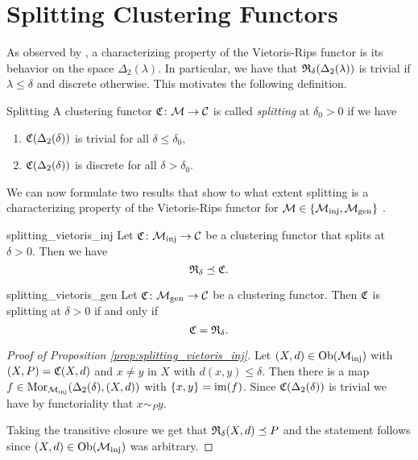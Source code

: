 \section{Splitting Clustering Functors}

As observed by \cite[Thm.~6.4]{Carlsson2010}, a characterizing property of the Vietoris-Rips functor is its behavior on the space $\Delta_2(\lambda)$. In particular, we have that $\mathfrak{R}_\delta(\Delta_2(\lambda))$ is trivial if $\lambda \le \delta$ and discrete otherwise.
This motivates the following definition.

\begin{definition}{Splitting}{}
    A clustering functor $\mathfrak{C}\colon \mathcal{M} \to \mathcal{C}$ is called \emph{splitting} at $\delta_0 > 0$ if we have
    \begin{enumerate}
        \item $\mathfrak{C}(\Delta_2(\delta))$ is trivial for all $\delta \leq \delta_0$,
        \item $\mathfrak{C}(\Delta_2(\delta))$ is discrete for all $\delta > \delta_0$.
    \end{enumerate}
\end{definition}

We can now formulate two results that show to what extent splitting is a characterizing property of the Vietoris-Rips functor for $\mathcal{M} \in \{{\mathcal{M}_\mathrm{inj}}, {\mathcal{M}_\mathrm{gen}}\}$ \cite[Thm.~6.4]{Carlsson2010}.

\begin{proposition}{}{splitting_vietoris_inj}
    Let $\mathfrak{C}\colon {\mathcal{M}_\mathrm{inj}} \to \mathcal{C}$ be a clustering functor that splits at $\delta > 0$. Then we have 
    $$
    \mathfrak{R}_\delta \preceq \mathfrak{C}.
    $$
\end{proposition}


\begin{proposition}{}{splitting_vietoris_gen}
    Let $\mathfrak{C}\colon {\mathcal{M}_\mathrm{gen}} \to \mathcal{C}$ be a clustering functor. Then $\mathfrak{C}$ is splitting at $\delta > 0$ if and only if 
    $$
    \mathfrak{C} = \mathfrak{R}_\delta.
    $$
\end{proposition}

\begin{proof}[Proof of Proposition \ref{prop:splitting_vietoris_inj}]
    Let $(X,d) \in \mathrm {Ob}({\mathcal{M}_\mathrm{inj}})$ with $(X,P) = \mathfrak{C}(X,d)$ and $x \neq y$ in $X$ with $d(x,y) \leq \delta$.
    Then there is a map $f \in \mathrm {Mor}_{\mathcal{M}_\mathrm{inj}}(\Delta_2(\delta), (X,d))$ with $\{x,y\} = \operatorname*{im}(f)$.
    Since $\mathfrak{C}(\Delta_2(\delta))$ is trivial we have by functoriality that $x \sim_P y$.

    Taking the transitive closure we get that $\mathfrak{R}_\delta(X,d) \preceq P$ and the statement follows since $(X,d) \in \mathrm {Ob}({\mathcal{M}_\mathrm{inj}})$ was arbitrary.
\end{proof}

